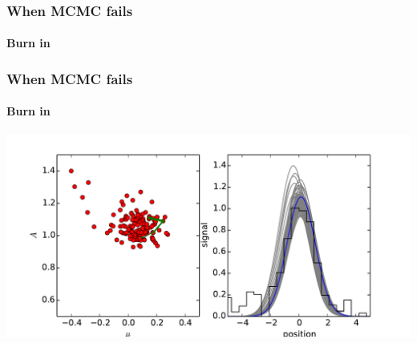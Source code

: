 \documentclass[]{beamer}
\begin{document}
\begin{frame}
  \frametitle{When MCMC fails} 
  \framesubtitle{Burn in} 
\end{frame}
\begin{frame}
  \frametitle{When MCMC fails} 
  \framesubtitle{Burn in} 
  \includegraphics[width=\textwidth]{movies/MCMC_burn_in_1.pdf}
\end{frame}
\end{document}
